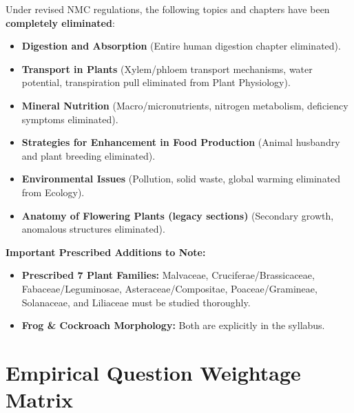 \documentclass[10pt,twoside,openright]{book}
\begin{document}
\begin{trapbox}
Under revised NMC regulations, the following topics and chapters have been \textbf{completely eliminated}:
\begin{itemize}
  \item \textbf{Digestion and Absorption} (Entire human digestion chapter eliminated).
  \item \textbf{Transport in Plants} (Xylem/phloem transport mechanisms, water potential, transpiration pull eliminated from Plant Physiology).
  \item \textbf{Mineral Nutrition} (Macro/micronutrients, nitrogen metabolism, deficiency symptoms eliminated).
  \item \textbf{Strategies for Enhancement in Food Production} (Animal husbandry and plant breeding eliminated).
  \item \textbf{Environmental Issues} (Pollution, solid waste, global warming eliminated from Ecology).
  \item \textbf{Anatomy of Flowering Plants (legacy sections)} (Secondary growth, anomalous structures eliminated).
\end{itemize}
\textbf{Important Prescribed Additions to Note:}
\begin{itemize}
  \item \textbf{Prescribed 7 Plant Families:} Malvaceae, Cruciferae/Brassicaceae, Fabaceae/Leguminosae, Asteraceae/Compositae, Poaceae/Gramineae, Solanaceae, and Liliaceae must be studied thoroughly.
  \item \textbf{Frog \& Cockroach Morphology:} Both are explicitly in the syllabus.
\end{itemize}
\end{trapbox}

\section*{Empirical Question Weightage Matrix}
\end{document}
